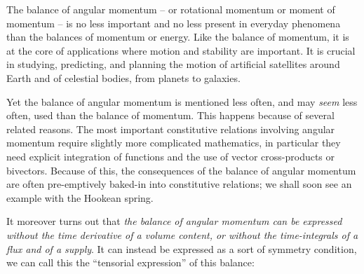 \documentclass[a4paper,12pt,%
onecolumn,oneside,%
british%
]{memoir}
\renewcommand*{\|}[1][]{\nonscript\:#1\vert\nonscript\:\mathopen{}}
\begin{document}
The balance of angular momentum -- or rotational momentum or moment of momentum -- is no less important and no less present in everyday phenomena than the balances of momentum or energy. Like the balance of momentum, it is at the core of applications where motion and stability are important. It is crucial in studying, predicting, and planning the motion of artificial satellites around Earth and of celestial bodies, from planets to galaxies.

Yet the balance of angular momentum is mentioned less often, and may \emph{seem} less often, used than the balance of momentum. This happens because of several related reasons. The most important constitutive relations involving angular momentum require slightly more complicated mathematics, in particular they need explicit integration of functions and the use of vector cross-products or bivectors. Because of this, the consequences of the balance of angular momentum are often pre-emptively baked-in into constitutive relations; we shall soon see an example with the Hookean spring.



It moreover turns out that \emph{the balance of angular momentum can be expressed without the time derivative of a volume content, or without the time-integrals of a flux and of a supply}. It can instead be expressed as a sort of symmetry condition, we can call this the \enquote{tensorial expression} of this balance:
\end{document}
